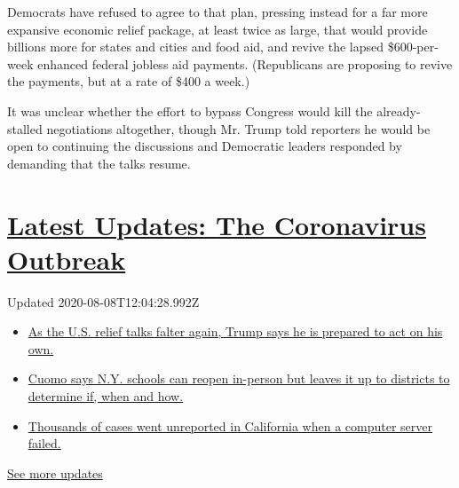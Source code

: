 Democrats have refused to agree to that plan, pressing instead for a far
more expansive economic relief package, at least twice as large, that
would provide billions more for states and cities and food aid, and
revive the lapsed \$600-per-week enhanced federal jobless aid payments.
(Republicans are proposing to revive the payments, but at a rate of
\$400 a week.)

It was unclear whether the effort to bypass Congress would kill the
already-stalled negotiations altogether, though Mr. Trump told reporters
he would be open to continuing the discussions and Democratic leaders
responded by demanding that the talks resume.

\hypertarget{latest-updates-the-coronavirus-outbreak}{%
\section{\texorpdfstring{\href{https://www.nytimes.com/2020/08/07/world/covid-19-news.html?action=click\&pgtype=Article\&state=default\&region=MAIN_CONTENT_1\&context=storylines_live_updates}{Latest
Updates: The Coronavirus
Outbreak}}{Latest Updates: The Coronavirus Outbreak}}\label{latest-updates-the-coronavirus-outbreak}}

Updated 2020-08-08T12:04:28.992Z

\begin{itemize}
\tightlist
\item
  \href{https://www.nytimes.com/2020/08/07/world/covid-19-news.html?action=click\&pgtype=Article\&state=default\&region=MAIN_CONTENT_1\&context=storylines_live_updates\#link-1f86d03a}{As
  the U.S. relief talks falter again, Trump says he is prepared to act
  on his own.}
\item
  \href{https://www.nytimes.com/2020/08/07/world/covid-19-news.html?action=click\&pgtype=Article\&state=default\&region=MAIN_CONTENT_1\&context=storylines_live_updates\#link-3f64a70a}{Cuomo
  says N.Y. schools can reopen in-person but leaves it up to districts
  to determine if, when and how.}
\item
  \href{https://www.nytimes.com/2020/08/07/world/covid-19-news.html?action=click\&pgtype=Article\&state=default\&region=MAIN_CONTENT_1\&context=storylines_live_updates\#link-14e70066}{Thousands
  of cases went unreported in California when a computer server failed.}
\end{itemize}

\href{https://www.nytimes.com/2020/08/07/world/covid-19-news.html?action=click\&pgtype=Article\&state=default\&region=MAIN_CONTENT_1\&context=storylines_live_updates}{See
more updates}

